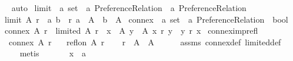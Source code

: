\begin{isabellebody}
\ \ \isamarkupfalse%
\ auto%
\endisatagproof
{\isafoldproof}%
%
\isadelimproof
\isanewline
%
\endisadelimproof
\isanewline
{}\isamarkupfalse%
\ limit\ {\isacharcolon}{\kern0pt}{\isacharcolon}{\kern0pt}\ {\isachardoublequoteopen}{\isacharprime}{\kern0pt}a\ set\ {\isasymRightarrow}\ {\isacharprime}{\kern0pt}a\ Preference{\isacharunderscore}{\kern0pt}Relation\ {\isasymRightarrow}\ {\isacharprime}{\kern0pt}a\ Preference{\isacharunderscore}{\kern0pt}Relation{\isachardoublequoteclose}\ \isanewline
\ \ {\isachardoublequoteopen}limit\ A\ r\ {\isacharequal}{\kern0pt}\ {\isacharbraceleft}{\kern0pt}{\isacharparenleft}{\kern0pt}a{\isacharcomma}{\kern0pt}\ b{\isacharparenright}{\kern0pt}\ {\isasymin}\ r{\isachardot}{\kern0pt}\ a\ {\isasymin}\ A\ {\isasymand}\ b\ {\isasymin}\ A{\isacharbraceright}{\kern0pt}{\isachardoublequoteclose}\isanewline
\isanewline
{}\isamarkupfalse%
\ connex\ {\isacharcolon}{\kern0pt}{\isacharcolon}{\kern0pt}\ {\isachardoublequoteopen}{\isacharprime}{\kern0pt}a\ set\ {\isasymRightarrow}\ {\isacharprime}{\kern0pt}a\ Preference{\isacharunderscore}{\kern0pt}Relation\ {\isasymRightarrow}\ bool{\isachardoublequoteclose}\ \isanewline
\ \ {\isachardoublequoteopen}connex\ A\ r\ {\isasymequiv}\ limited\ A\ r\ {\isasymand}\ {\isacharparenleft}{\kern0pt}{\isasymforall}x\ {\isasymin}\ A{\isachardot}{\kern0pt}\ {\isasymforall}y\ {\isasymin}\ A{\isachardot}{\kern0pt}\ x\ {\isasympreceq}\isactrlsub r\ y\ {\isasymor}\ y\ {\isasympreceq}\isactrlsub r\ x{\isacharparenright}{\kern0pt}{\isachardoublequoteclose}\isanewline
\isanewline
{}\isamarkupfalse%
\ connex{\isacharunderscore}{\kern0pt}imp{\isacharunderscore}{\kern0pt}refl{\isacharcolon}{\kern0pt}\isanewline
\ \ \ {\isachardoublequoteopen}connex\ A\ r{\isachardoublequoteclose}\isanewline
\ \ \ {\isachardoublequoteopen}refl{\isacharunderscore}{\kern0pt}on\ A\ r{\isachardoublequoteclose}\isanewline
%
\isadelimproof
%
\endisadelimproof
%
\isatagproof
{}\isamarkupfalse%
\isanewline
\ \ \isamarkupfalse%
\ {\isachardoublequoteopen}r\ {\isasymsubseteq}\ A\ {\isasymtimes}\ A{\isachardoublequoteclose}\isanewline
\ \ \ \ \isamarkupfalse%
\ assms\ connex{\isacharunderscore}{\kern0pt}def\ limited{\isacharunderscore}{\kern0pt}def\isanewline
\ \ \ \ \isamarkupfalse%
\ metis\isanewline
{}\isamarkupfalse%
\isanewline
\ \ \isamarkupfalse%
\isanewline
\ \ \ \ x\ {\isacharcolon}{\kern0pt}{\isacharcolon}{\kern0pt}\ {\isachardoublequoteopen}{\isacharprime}{\kern0pt}a{\isachardoublequoteclose}\isanewline

\end{isabellebody}
